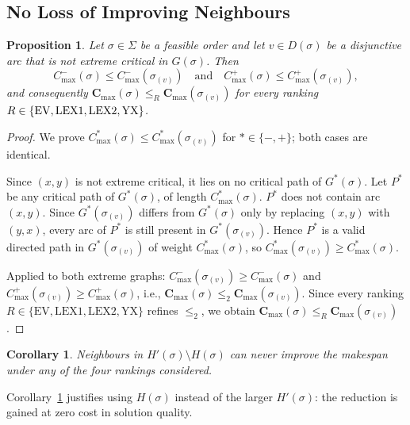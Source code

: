 \documentclass[preprint,12pt]{elsarticle}
\newtheorem{proposition}{Proposition}
\newtheorem{corollary}{Corollary}
\begin{document}
\subsection{No Loss of Improving Neighbours}
\label{sec4.2}

\begin{proposition}
\label{prop2}
Let $\sigma \in \Sigma$ be a feasible order and let $v \in D(\sigma)$ be a disjunctive arc that is \emph{not} extreme critical in $G(\sigma)$. Then
\begin{equation}
C^-_{\max}(\sigma) \leq C^-_{\max}(\sigma_{(v)}) \quad\text{and}\quad C^+_{\max}(\sigma) \leq C^+_{\max}(\sigma_{(v)}),
\end{equation}
and consequently $\mathbf{C}_{\max}(\sigma) \leq_{R} \mathbf{C}_{\max}(\sigma_{(v)})$ for every ranking $R \in \{{\rm EV}, {\rm LEX1}, {\rm LEX2}, {\rm YX}\}$.
\end{proposition}

\begin{proof}
We prove $C^*_{\max}(\sigma)\le C^*_{\max}(\sigma_{(v)})$ for $*\in\{-,+\}$; both cases are identical.

Since $(x,y)$ is not extreme critical, it lies on no critical path of $G^*(\sigma)$.
Let $P^*$ be any critical path of $G^*(\sigma)$, of length $C^*_{\max}(\sigma)$.
$P^*$ does not contain arc $(x,y)$.
Since $G^*(\sigma_{(v)})$ differs from $G^*(\sigma)$ only by replacing $(x,y)$ with $(y,x)$,
every arc of $P^*$ is still present in $G^*(\sigma_{(v)})$.
Hence $P^*$ is a valid directed path in $G^*(\sigma_{(v)})$ of weight $C^*_{\max}(\sigma)$,
so $C^*_{\max}(\sigma_{(v)})\ge C^*_{\max}(\sigma)$.

Applied to both extreme graphs: $C^-_{\max}(\sigma_{(v)})\ge C^-_{\max}(\sigma)$ and
$C^+_{\max}(\sigma_{(v)})\ge C^+_{\max}(\sigma)$,
i.e., $\mathbf{C}_{\max}(\sigma)\le_2\mathbf{C}_{\max}(\sigma_{(v)})$.
Since every ranking $R\in\{\mathrm{EV},\mathrm{LEX1},\mathrm{LEX2},\mathrm{YX}\}$ refines $\le_2$,
we obtain $\mathbf{C}_{\max}(\sigma)\le_R\mathbf{C}_{\max}(\sigma_{(v)})$.
\end{proof}

\medskip

\begin{corollary}
\label{cor1}
Neighbours in $H'(\sigma) \setminus H(\sigma)$ can never improve the makespan under any of the four rankings considered.
\end{corollary}

Corollary~\ref{cor1} justifies using $H(\sigma)$ instead of the larger $H'(\sigma)$: the reduction is gained at zero cost in solution quality.
\end{document}
